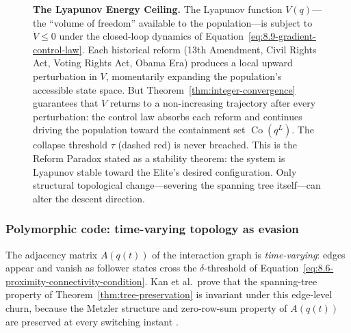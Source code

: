 \begin{figure}[htbp]
\caption{\textbf{The Lyapunov Energy Ceiling.} The Lyapunov function $V(q)$---the ``volume of freedom'' available to the population---is subject to $\dot V \leq 0$ under the closed-loop dynamics of Equation~\ref{eq:8.9-gradient-control-law}. Each historical reform (13th Amendment, Civil Rights Act, Voting Rights Act, Obama Era) produces a local upward perturbation in $V$, momentarily expanding the population's accessible state space. But Theorem~\ref{thm:integer-convergence} guarantees that $V$ returns to a non-increasing trajectory after every perturbation: the control law absorbs each reform and continues driving the population toward the containment set $\operatorname{Co}(q^L)$. The collapse threshold $\tau$ (dashed red) is never breached. This is the Reform Paradox stated as a stability theorem: the system is Lyapunov stable toward the Elite's desired configuration. Only structural topological change---severing the spanning tree itself---can alter the descent direction.}
\label{fig:lyapunov_ceiling}
\end{figure}

\subsubsection*{Polymorphic code: time-varying topology as evasion}

The adjacency matrix $A(q(t))$ of the interaction graph is \textit{time-varying}: edges appear and vanish as follower states cross the $\delta$-threshold of Equation~\ref{eq:8.6-proximity-connectivity-condition}. Kan et al.\ prove \cite{kan_containment} that the spanning-tree property of Theorem~\ref{thm:tree-preservation} is invariant under this edge-level churn, because the Metzler structure and zero-row-sum property of $A(q(t))$ are preserved at every switching instant \cite{moreau_consensus}.

